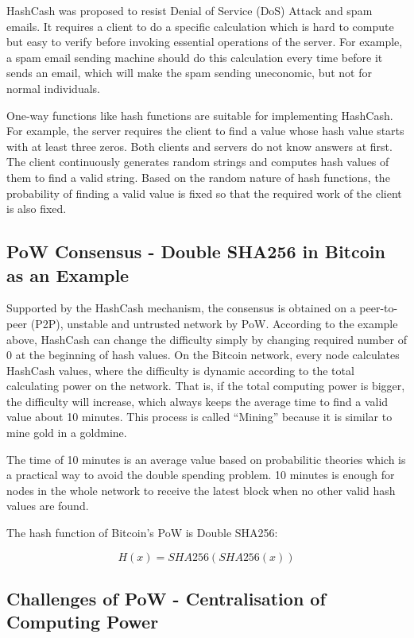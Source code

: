 \documentclass[11pt]{article}
\begin{document}
HashCash was proposed to resist Denial of Service (DoS) Attack and spam emails. It requires a client to do a specific calculation which is hard to compute but easy to verify before invoking essential operations of the server. For example, a spam email sending machine should do this calculation every time before it sends an email, which will make the spam sending uneconomic, but not for normal individuals. 

One-way functions like hash functions are suitable for implementing HashCash. For example, the server requires the client to find a value whose hash value starts with at least three zeros. Both clients and servers do not know answers at first. The client continuously generates random strings and computes hash values of them to find a valid string. Based on the random nature of hash functions, the probability of finding a valid value is fixed so that the required work of the client is also fixed.

\subsection{PoW Consensus - Double SHA256 in Bitcoin as an Example}

Supported by the HashCash mechanism, the consensus is obtained on a peer-to-peer (P2P), unstable and untrusted network by PoW. According to the example above, HashCash can change the difficulty simply by changing required number of 0 at the beginning of hash values. On the Bitcoin network, every node calculates HashCash values, where the difficulty is dynamic according to the total calculating power on the network. That is, if the total computing power is bigger, the difficulty will increase, which always keeps the average time to find a valid value about 10 minutes. This process is called ``Mining'' because it is similar to mine gold in a goldmine.

The time of 10 minutes is an average value based on probabilitic theories which is a practical way to avoid the double spending problem. 10 minutes is enough for nodes in the whole network to receive the latest block when no other valid hash values are found.

The hash function of Bitcoin's PoW is Double SHA256:

\[ H(x) = SHA256(SHA256(x)) \]

\subsection{Challenges of PoW - Centralisation of Computing Power}
\end{document}
